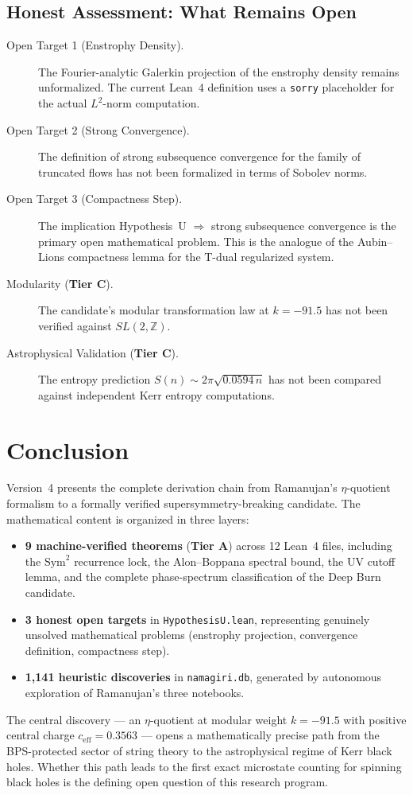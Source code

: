 \documentclass[11pt,a4paper]{article}
\theoremstyle{plain}
\theoremstyle{definition}
\theoremstyle{remark}
\newcommand{\tierA}{\textbf{Tier A}}
\newcommand{\tierC}{\textbf{Tier C}}
\begin{document}
\subsection{Honest Assessment: What Remains Open}

\begin{description}
  \item[Open Target 1 (Enstrophy Density).] The Fourier-analytic Galerkin
  projection of the enstrophy density remains unformalized. The current
  Lean~4 definition uses a \texttt{sorry} placeholder for the actual
  $L^2$-norm computation.
  \item[Open Target 2 (Strong Convergence).] The definition of strong
  subsequence convergence for the family of truncated flows has not been
  formalized in terms of Sobolev norms.
  \item[Open Target 3 (Compactness Step).] The implication
  Hypothesis~U $\Rightarrow$ strong subsequence convergence is the
  primary open mathematical problem. This is the analogue of the
  Aubin--Lions compactness lemma for the T-dual regularized system.
  \item[Modularity (\tierC{}).] The candidate's modular transformation
  law at $k = -91.5$ has not been verified against $SL(2, \mathbb{Z})$.
  \item[Astrophysical Validation (\tierC{}).] The entropy prediction
  $S(n) \sim 2\pi\sqrt{0.0594\,n}$ has not been compared against
  independent Kerr entropy computations.
\end{description}

\section{Conclusion}

Version~4 presents the complete derivation chain from Ramanujan's
$\eta$-quotient formalism to a formally verified supersymmetry-breaking
candidate. The mathematical content is organized in three layers:
\begin{itemize}
  \item \textbf{9 machine-verified theorems} (\tierA{}) across 12 Lean~4
  files, including the $\mathrm{Sym}^2$ recurrence lock, the
  Alon--Boppana spectral bound, the UV cutoff lemma, and the complete
  phase-spectrum classification of the Deep Burn candidate.
  \item \textbf{3 honest open targets} in \texttt{HypothesisU.lean},
  representing genuinely unsolved mathematical problems (enstrophy
  projection, convergence definition, compactness step).
  \item \textbf{1,141 heuristic discoveries} in \texttt{namagiri.db},
  generated by autonomous exploration of Ramanujan's three notebooks.
\end{itemize}
The central discovery --- an $\eta$-quotient at modular weight
$k = -91.5$ with positive central charge $c_{\mathrm{eff}} = 0.3563$ ---
opens a mathematically precise path from the BPS-protected sector of
string theory to the astrophysical regime of Kerr black holes. Whether
this path leads to the first exact microstate counting for spinning black
holes is the defining open question of this research program.
\end{document}
